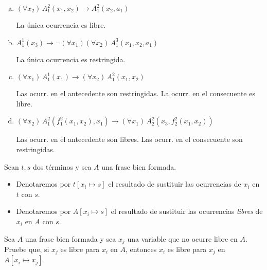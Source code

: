 \begin{enumerate}[(a)]
    \item $(\forall x_2) \, A_1^2(x_1, x_2) \to A_1^2(x_2, a_1)$
    \begin{solution}
    La única ocurrencia es libre.
    \end{solution}
    
    \item $A_1^1(x_3) \to \neg (\forall x_1) (\forall x_2) \, A_1^3(x_1, x_2, a_1)$
    \begin{solution}
    La única ocurrencia es restringida.
    \end{solution}
    
    \item $(\forall x_1) \, A_1^1(x_1) \to (\forall x_2) \, A_1^2(x_1, x_2)$
    \begin{solution}
    Las ocurr. en el antecedente son restringidas. La ocurr. en el consecuente es libre.
    \end{solution}
    
    \item $(\forall x_2) \, A_1^2(f_1^2(x_1, x_2), x_1) \to (\forall x_1) \, A_2^2(x_3, f_2^2(x_1, x_2))$
    \begin{solution}
    Las ocurr. en el antecedente son libres. Las ocurr. en el consecuente son restringidas.
    \end{solution}
\end{enumerate}

\begin{notation}
Sean $t,s$ dos términos y sea $A$ una frase bien formada.
\begin{itemize}
    \item Denotaremos por $t[x_i \mapsto s]$ el resultado de sustituir las ocurrencias de $x_i$ en $t$ con $s$.
    \item Denotaremos por $A[x_i \mapsto s]$ el resultado de sustituir las ocurrencias \textit{libres} de $x_i$ en $A$ con $s$.
\end{itemize}
\end{notation}

\begin{exercise}
Sea $A$ una frase bien formada y sea $x_j$ una variable que no ocurre libre en $A$. Pruebe que, si $x_j$ es libre para $x_i$ en $A$, entonces $x_i$ es libre para $x_j$ en $A[x_i \mapsto x_j]$.
\end{exercise}

